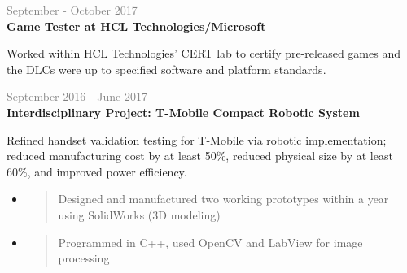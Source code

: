 \documentclass[letterpage]{article}
\begin{document}
\begin{minipage}[t]{0.63\linewidth}
\vspace{7px}
\textcolor{gray}{September - October 2017}\\
\textbf{\textsf{Game Tester at HCL Technologies/Microsoft}}\\
\raggedright
Worked within HCL Technologies' CERT lab to certify pre-released
games and the DLCs were up to specified software and platform standards.

\vspace{7px}
\textcolor{gray}{September 2016 - June 2017}\\
\textbf{\textsf{Interdisciplinary Project:
		T-Mobile Compact Robotic System}}\\
\raggedright
Refined handset validation testing for T-Mobile via robotic
implementation;\\reduced manufacturing cost by at least 50\%,
reduced physical size by at least 60\%, and improved
power efficiency.\\
\begin{itemize}[leftmargin=*,labelindent=1mm,labelsep=0mm]
\renewcommand\labelitemi{\rule[1mm]{0.33mm}{0.33mm}}
\renewcommand\labelitemii{$\blacksquare$}
\item
  \begin{quote}
  \raggedright
  Designed and manufactured two working prototypes within
  a year using SolidWorks (3D modeling)
  \end{quote}

\item
  \begin{quote}
  \raggedright
  Programmed in C++,
  used OpenCV and LabView for image processing
  \end{quote}
\end{itemize}


\end{minipage}
\end{document}
